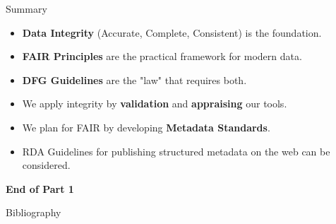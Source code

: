 \begin{frame}{Summary}
    \begin{itemize}
        \item \textbf{Data Integrity} (Accurate, Complete, Consistent) is the foundation.
        \item \textbf{FAIR Principles} are the practical framework for modern data.
        \item \textbf{DFG Guidelines} are the "law" that requires both.
        \item We apply integrity by \textbf{validation} and \textbf{appraising} our tools.
        \item We plan for FAIR by developing \textbf{Metadata Standards}.
        \item RDA Guidelines for publishing structured metadata on the web \cite{wu_2021_5727048} can be considered.
    \end{itemize}
    \vfill
    \begin{center}
        \textbf{End of Part 1}
    \end{center}
\end{frame}

\begin{frame}{Bibliography}
    \printbibliography
\end{frame}